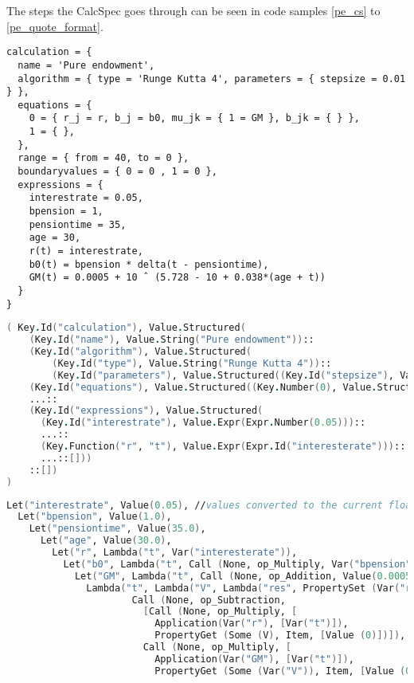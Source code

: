 The steps the CalcSpec goes through can be seen in code samples \ref{pe_cs} to \ref{pe_quote_format}.

\begin{lstlisting}[language=calcspec, caption=Pure endowment in CalcSpec, label=pe_cs]
calculation = {
  name = 'Pure endowment',
  algorithm = { type = 'Runge Kutta 4', parameters = { stepsize = 0.01 } },
  equations = {
    0 = { r_j = r, b_j = b0, mu_jk = { 1 = GM }, b_jk = { } },
    1 = { },
  },
  range = { from = 40, to = 0 },
  boundaryvalues = { 0 = 0 , 1 = 0 },
  expressions = {
    interestrate = 0.05,
    bpension = 1,
    pensiontime = 35,
    age = 30,
    r(t) = interestrate,
    b0(t) = bpension * delta(t - pensiontime),
    GM(t) = 0.0005 + 10 ˆ (5.728 - 10 + 0.038*(age + t))
  }
}
\end{lstlisting}

\begin{lstlisting}[language=fsharp, caption=CalcSpec AST, label=pe_ast]
( Key.Id("calculation"), Value.Structured(
    (Key.Id("name"), Value.String("Pure endowment"))::
    (Key.Id("algorithm"), Value.Structured(
        (Key.Id("type"), Value.String("Runge Kutta 4"))::
        (Key.Id("parameters"), Value.Structured((Key.Id("stepsize"), Value.Expr(Expr.Number(0.01)))::[])))::[])::
    (Key.Id("equations"), Value.Structured((Key.Number(0), Value.Structured(...:[]))::[]))::
    ...::
    (Key.Id("expressions"), Value.Structured(
      (Key.Id("interestrate"), Value.Expr(Expr.Number(0.05)))::
      ...::
      (Key.Function("r", "t"), Value.Expr(Expr.Id("interesterate")))::
      ...::[]))
    ::[])
)
\end{lstlisting}

\begin{lstlisting}[language=fsharp, caption=Quotation AST generated from CalcSpec AST, label=pe_quote]
Let("interestrate", Value(0.05), //values converted to the current floatP type
  Let("bpension", Value(1.0), 
    Let("pensiontime", Value(35.0), 
      Let("age", Value(30.0), 
        Let("r", Lambda("t", Var("interesterate")), 
          Let("b0", Lambda("t", Call (None, op_Multiply, Var("bpension")::[Application(Var("delta"), Call (None, op_Subtraction, Var("t")::[Var("pensiontime")]))])), 
            Let("GM", Lambda("t", Call (None, op_Addition, Value(0.0005)::[...])), 
              Lambda("t", Lambda("V", Lambda("res", PropertySet (Var("res"), Item, [Value (0),
                      Call (None, op_Subtraction,
                        [Call (None, op_Multiply, [
                          Application(Var("r"), [Var("t")]),
                          PropertyGet (Some (V), Item, [Value (0)])]),
                        Call (None, op_Multiply, [
                          Application(Var("GM"), [Var("t")]),
                          PropertyGet (Some (Var("V")), Item, [Value (0)])])])]))))))))))))
\end{lstlisting}

